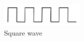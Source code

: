 \begin{figure}[H]
  \centering
  \includegraphics[clip, trim=0cm 0cm 0cm 0cm, width=4cm]{fig/square_wave.pdf}
  \caption{Square wave}
\end{figure}
